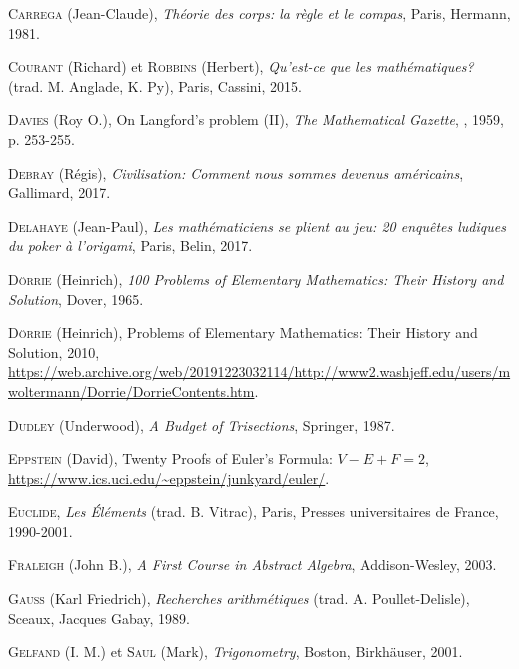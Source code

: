 \begin{thebibliography}{99}
\textsc{Carrega} (Jean-Claude), \emph{Théorie des corps: la règle et le compas}, Paris, Hermann, 1981.

  \textsc{Courant} (Richard) et \textsc{Robbins} (Herbert), \emph{Qu'est-ce que les mathématiques?} (trad. M. Anglade, K. Py), Paris, Cassini, 2015.


  \textsc{Davies} (Roy O.), \og On {Langford's} problem {(II)}\fg, \emph{The Mathematical Gazette}, , 1959, p. 253-255.

\textsc{Debray} (Régis), \emph{Civilisation: Comment nous sommes devenus américains}, Gallimard, 2017.

\textsc{Delahaye} (Jean-Paul), \emph{Les mathématiciens se plient au jeu: 20 enquêtes ludiques du poker à l'origami}, Paris, Belin, 2017. 

  \textsc{D\"{o}rrie} (Heinrich), \emph{100 Problems of Elementary Mathematics: Their History and Solution}, Dover, 1965.


  \textsc{D\"{o}rrie} (Heinrich),  Problems of Elementary Mathematics: Their History and Solution\fg, 2010, \url{https://web.archive.org/web/20191223032114/http://www2.washjeff.edu/users/mwoltermann/Dorrie/DorrieContents.htm}.


  \textsc{Dudley} (Underwood), \emph{A Budget of Trisections}, Springer, 1987.




  \textsc{Eppstein} (David), \og Twenty Proofs of {Euler's} Formula: {$V-E+F=2$}\fg, \url{https://www.ics.uci.edu/~eppstein/junkyard/euler/}.

\textsc{Euclide}, \emph{Les \'Eléments} (trad. B. Vitrac),  Paris, Presses universitaires de France, 1990-2001.


  \textsc{Fraleigh} (John B.), \emph{A First Course in Abstract Algebra}, Addison-Wesley, 2003.

  \textsc{Gauss} (Karl Friedrich), \emph{Recherches arithmétiques} (trad. A. Poullet-Delisle), Sceaux, Jacques Gabay, 1989.


 
  \textsc{Gelfand} (I. M.) et \textsc{Saul} (Mark), \emph{Trigonometry}, Boston, Birkhäuser, 2001.


\end{thebibliography}
